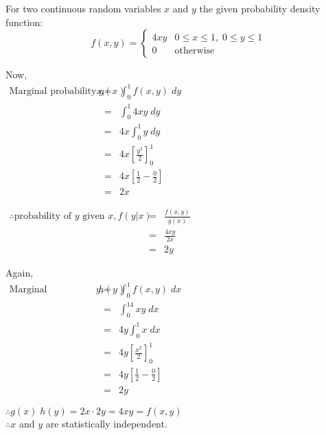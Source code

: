 \documentclass{article}
\begin{document}
\Large{
    For two continuous random variables $x$ and $y$ the given probability density function:
    $$f(x,y)=
    \begin{cases}
      4xy & 0\leq x\leq 1,\; 0\leq y \leq 1\\
        0 & \text{otherwise}
   \end{cases}
    $$

    Now,\\
    \begin{eqnarray*}
        \text{Marginal probability of $x$,}\;g(x) &=& \int_0^1f(x, y)\;dy\\
        &=& \int_0^1 4xy\;dy\\
        &=& 4x\int_0^1y\;dy\\
        &=& 4x\left[\frac{y^2}{2}\right]_0^1\\
        &=& 4x\left[\frac{1}{2} - \frac{0}{2}\right]\\
        &=& 2x\hspace{10cm}
    \end{eqnarray*}

    \begin{eqnarray*}
        \therefore \text{probability of $y$ given $x$}, f(y|x) &=& \frac{f(x,y)}{g(x)}\\
        &=& \frac{4xy}{2x}\\
        &=& 2y\hspace{10cm}
    \end{eqnarray*}

    Again,
    \begin{eqnarray*}
        \text{Marginal probability of $y$,}\;h(y) &=& \int_0^1f(x,y)\;dx\\
        &=& \int_0^14xy\;dx\\
        &=& 4y\int_0^1x\;dx\\
        &=& 4y\left[\frac{x^2}{2}\right]_0^1\\
        &=& 4y\left[\frac{1}{2}-\frac{0}{2}\right]\\
        &=& 2y\hspace{10cm}
    \end{eqnarray*}

    $\therefore g(x)\;h(y) = 2x\cdot2y=4xy=f(x,y)$\\

    $\therefore x$ and $y$ are statistically independent.
}

\newpage

\section{}
\end{document}
